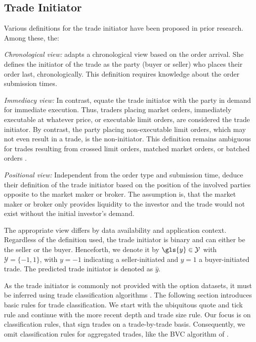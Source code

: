 \subsection{Trade Initiator}
\label{sec:trade-initiator}

Various definitions for the trade initiator have been proposed in prior
research. Among these, the:

\emph{Chronological view:} \textcite[][267]{odders-whiteOccurrenceConsequencesInaccurate2000} adapts a chronological view based on the order arrival. She defines the initiator of the trade as the party (buyer or seller) who places their order last, chronologically. This definition requires knowledge about the order submission times.

\emph{Immediacy view:} In contrast, \textcite[][94--97]{leeInferringInvestorBehavior2000} equate the trade initiator with the party in demand for immediate execution. Thus, traders placing market orders, immediately executable at whatever price, or executable limit orders, are considered the trade initiator. By contrast, the party placing non-executable limit orders, which may not even result in a trade, is the non-initiator. This definition remains ambiguous for trades resulting from crossed limit orders, matched market orders, or batched orders \autocite[][94--95]{leeInferringInvestorBehavior2000}.

\emph{Positional view:} Independent from the order type and submission time, \textcite[][533]{ellisAccuracyTradeClassification2000} deduce their definition of the trade initiator based on the position of the involved parties opposite to the market maker or broker. The assumption is, that the market maker or broker only provides liquidity to the investor and the trade would not exist without the initial investor's demand.

The appropriate view differs by data availability and application context.
Regardless of the definition used, the trade initiator is binary and can either be the seller or the buyer. Henceforth, we denote it by $\gls{y} \in \mathcal{Y}$ with $\mathcal{Y}=\{-1,1\}$, with $y=-1$ indicating a seller-initiated and $y=1$ a buyer-initiated trade. The predicted trade initiator is denoted as $\hat{y}$.

As the trade initiator is commonly not provided with the option datasets, it must be inferred using trade classification algorithms \autocite[][453]{easleyOptionVolumeStock1998}. The following section introduces basic rules for trade classification. We start with the ubiquitous quote and tick rule and continue with the more recent depth and trade size rule. Our focus is on classification rules, that sign trades on a trade-by-trade basis. Consequently, we omit classification rules for aggregated trades, like the \gls{BVC} algorithm of \textcite[][1466--1468]{easleyFlowToxicityLiquidity2012}.

